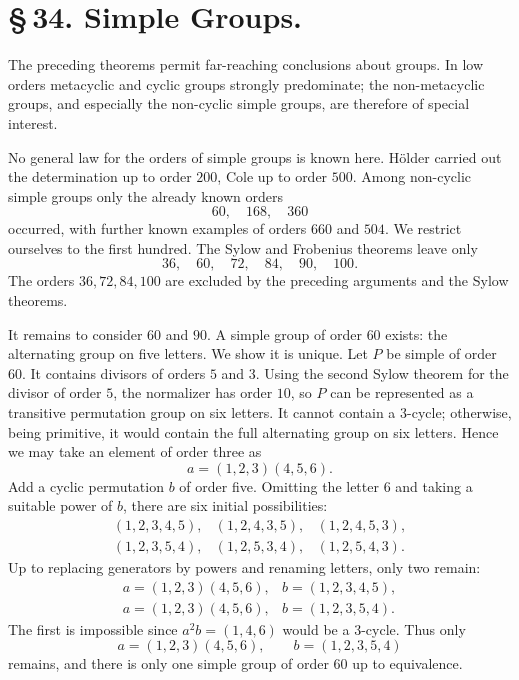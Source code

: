 \documentclass[11pt]{article}
\begin{document}
\section*{\S\,34. Simple Groups.}

The preceding theorems permit far-reaching conclusions about groups. In low orders metacyclic and cyclic groups strongly predominate; the non-metacyclic groups, and especially the non-cyclic simple groups, are therefore of special interest.

No general law for the orders of simple groups is known here. Hölder carried out the determination up to order $200$, Cole up to order $500$. Among non-cyclic simple groups only the already known orders
\[
60,
\quad 168,
\quad 360
\]
occurred, with further known examples of orders $660$ and $504$. We restrict ourselves to the first hundred. The Sylow and Frobenius theorems leave only
\[
36,
\quad 60,
\quad 72,
\quad 84,
\quad 90,
\quad 100.
\]
The orders $36,72,84,100$ are excluded by the preceding arguments and the Sylow theorems.

It remains to consider $60$ and $90$. A simple group of order $60$ exists: the alternating group on five letters. We show it is unique. Let $P$ be simple of order $60$. It contains divisors of orders $5$ and $3$. Using the second Sylow theorem for the divisor of order $5$, the normalizer has order $10$, so $P$ can be represented as a transitive permutation group on six letters. It cannot contain a 3-cycle; otherwise, being primitive, it would contain the full alternating group on six letters. Hence we may take an element of order three as
\[
a=(1,2,3)(4,5,6).
\]
Add a cyclic permutation $b$ of order five. Omitting the letter $6$ and taking a suitable power of $b$, there are six initial possibilities:
\[
\begin{array}{lll}
(1,2,3,4,5),&(1,2,4,3,5),&(1,2,4,5,3),\\
(1,2,3,5,4),&(1,2,5,3,4),&(1,2,5,4,3).
\end{array}
\]
Up to replacing generators by powers and renaming letters, only two remain:
\[
\begin{array}{ll}
a=(1,2,3)(4,5,6),& b=(1,2,3,4,5),\\
a=(1,2,3)(4,5,6),& b=(1,2,3,5,4).
\end{array}
\]
The first is impossible since $a^2b=(1,4,6)$ would be a 3-cycle. Thus only
\[
a=(1,2,3)(4,5,6),\qquad b=(1,2,3,5,4)
\]
remains, and there is only one simple group of order $60$ up to equivalence.
\end{document}
